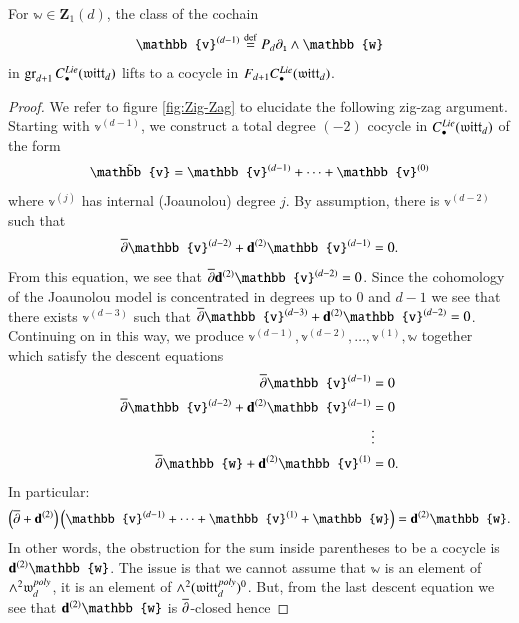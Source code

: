 \documentclass[main.tex]{subfiles}
\begin{document}
\begin{lemma}\label{lem:descent}
  For $\mathbb{w}\in \mathbf{Z}_1(d)$, the class of the cochain 
  \[
    \mathbb{v}^{(d-1)} \define P_d\del_{\1} \wedge\mathbb{w}
  \]
  in $\operatorname{gr}_{d+1} C^{Lie}_{\bullet}(\mathfrak{witt}_d)$ lifts
  to a cocycle in $F_{d+1} C^{Lie}_{\bullet}(\mathfrak{witt}_d)$.
\end{lemma}
\begin{proof}
    We refer to figure \ref{fig:Zig-Zag} to elucidate the following zig-zag argument.
    Starting with $\mathbb{v}^{(d-1)}$, we construct a total degree $(-2)$ cocycle in $C^{Lie}_\bullet (\mathfrak{witt}_d)$ of the form 
    \begin{equation}\label{eq:sumcocycle}
      \til{\mathbb{v}} = \mathbb{v}^{(d-1)} + \cdots + \mathbb{v}^{(0)} 
    \end{equation}
where $\mathbb{v}^{(j)}$ has internal (Joaunolou) degree $j$.
    By assumption, there is $\mathbb{v}^{(d-2)}$ such that 
    \[
      \dbar \mathbb{v}^{(d-2)} + \bd^{(2)} \mathbb{v}^{(d-1)} = 0 .
    \]
    From this equation, we see that $\dbar\bd^{(2)} \mathbb{v}^{(d-2)} = 0$.
    Since the cohomology of the Joaunolou model is concentrated in degrees up to $0$ and $d-1$ we see that there exists
    $\mathbb{v}^{(d-3)}$ such that $\dbar \mathbb{v}^{(d-3)} + \bd^{(2)} \mathbb{v}^{(d-2)} = 0$.
    Continuing on in this way, we produce $\mathbb{v}^{(d-1)}, \mathbb{v}^{(d-2)}, \ldots, \mathbb{v}^{(1)}, \mathbb{w}$
    together which
    satisfy the descent equations 
    \begin{align*}
      \dbar \mathbb{v}^{(d-1)} & = 0 \\
      \dbar \mathbb{v}^{(d-2)} + \bd^{(2)} \mathbb{v}^{(d-1)} & = 0 \\
                                                             & \vdots \\
      \dbar \mathbb{w} + \bd^{(2)} \mathbb{v}^{(1)} & = 0 .
    \end{align*}
    In particular:
    \begin{equation}\label{}
      \left(\dbar + \bd^{(2)}\right)\left(\mathbb{v}^{(d-1)} + \cdots + \mathbb{v}^{(1)} + \mathbb{w}\right) = \bd^{(2)} 
      \mathbb{w} .
    \end{equation}
    In other words, the obstruction for the sum inside parentheses to be a cocycle is $\bd^{(2)} \mathbb{w}$.
    The issue is that we cannot assume that $\mathbb{w}$ is an element of $\wedge^2 \mathfrak{w}_d^{poly}$, it is an element
    of $\wedge^2 (\mathfrak{witt}_d^{poly})^0$.
    But, from the last descent equation we see that $\bd^{(2)} \mathbb{w}$ is $\overline{\partial}$-closed hence 

\end{proof}
\end{document}
